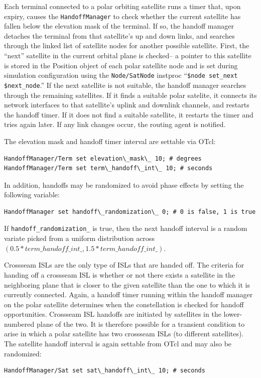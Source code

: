 Each terminal connected to a polar orbiting satellite runs a timer that,
upon expiry, causes the {\tt HandoffManager} to check whether the current 
satellite has fallen below the
elevation mask of the terminal.  If so, the handoff manager detaches the
terminal from that satellite's up and down links, and searches
through the linked list of satellite nodes for another possible satellite.
First, the ``next'' satellite in the current orbital plane is checked-- a 
pointer to this satellite is stored in the Position object of each
polar satellite node and is set during simulation configuration using
the {\tt Node/SatNode} instproc ``{\tt \$node set\_next \$next\_node}.''
If the next satellite is not suitable, the handoff manager searches
through the remaining satellites.  If it finds a suitable polar
satelite, it connects its network interfaces to that satellite's uplink and 
downlink channels, and restarts the handoff timer.  If it does not find 
a suitable
satellite, it restarts the timer and tries again later.  If any link
changes occur, the routing agent is notified.

The elevation mask and handoff timer interval are settable via OTcl: 
\begin{verbatim}
HandoffManager/Term set elevation\_mask\_ 10; # degrees
HandoffManager/Term set term\_handoff\_int\_ 10; # seconds
\end{verbatim}
In addition, handoffs may be randomized to avoid phase effects by setting
the following variable:
\begin{verbatim}
HandoffManager set handoff\_randomization\_ 0; # 0 is false, 1 is true 
\end{verbatim}
If {\tt handoff\_randomization\_} is true, then the next handoff interval
is a random variate picked from a uniform distribution across
$(0.5 * term\_handoff\_int\_, 1.5 * term\_handoff\_int\_)$.  

Crossseam ISLs are the only type of ISLs that are handed off.  The criteria
for handing off a crossseam ISL is whether or not there exists a satellite
in the neighboring plane that is closer to the given satellite than the
one to which it is currently connected.  Again, a handoff timer running
within the handoff manager on the polar satellite determines when the
constellation is checked for handoff opportunities.  Crossseam ISL
handoffs are
initiated by satellites in the lower-numbered plane of the two.  It is
therefore possible for a transient condition to arise in which a polar
satellite has two crossseam ISLs (to different satellites).  The
satellite handoff interval is again settable from OTcl and may also be
randomized:
\begin{verbatim}
HandoffManager/Sat set sat\_handoff\_int\_ 10; # seconds
\end{verbatim}


